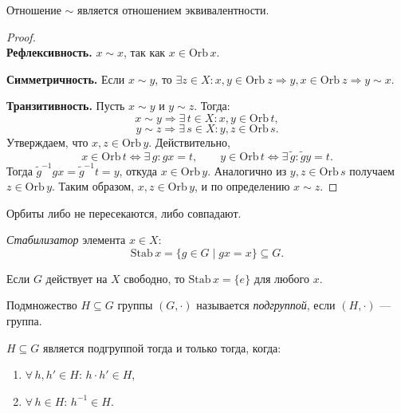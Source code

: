 \begin{stmt}
    Отношение $\sim$ является отношением эквивалентности.
    \begin{proof}

        \textbf{\\Рефлексивность.} $x \sim x$, так как $x \in \mathrm{Orb}\, x$.

        \textbf{Симметричность.} Если $x \sim y$, то $\exists z \in X: x, y \in \mathrm{Orb}\ z \Rightarrow
        y, x \in \mathrm{Orb}\ z \Rightarrow y \sim x$.

        \textbf{Транзитивность.} Пусть $x \sim y$ и $y \sim z$. Тогда:
        \[
            x \sim y \Rightarrow \exists\, t \in X\colon x, y \in \mathrm{Orb}\, t,
        \]
        \[
            y \sim z \Rightarrow \exists\, s \in X\colon y, z \in \mathrm{Orb}\, s.
        \]
        Утверждаем, что $x, z \in \mathrm{Orb}\, y$. Действительно,
        \[
            x \in \mathrm{Orb}\, t \Leftrightarrow \exists\, g\colon gx = t,
            \qquad
            y \in \mathrm{Orb}\, t \Leftrightarrow \exists\, \tilde{g}\colon \tilde{g}y = t.
        \]
        Тогда $\tilde{g}^{-1} g x = \tilde{g}^{-1} t = y$, откуда $x \in \mathrm{Orb}\, y$.
        Аналогично из $y, z \in \mathrm{Orb}\, s$ получаем $z \in \mathrm{Orb}\, y$.
        Таким образом, $x, z \in \mathrm{Orb}\, y$, и по определению $x \sim z$.
    \end{proof}
\end{stmt}

\begin{cor}
    Орбиты либо не пересекаются, либо совпадают.
\end{cor}



\begin{definition}
    \emph{Стабилизатор} элемента $x \in X$:
    \[
        \mathrm{Stab}\, x = \{g \in G \mid gx = x\} \subseteq G.
    \]
\end{definition}

\begin{example}
    Если $G$ действует на $X$ свободно, то $\mathrm{Stab}\, x = \{e\}$ для любого $x$.
\end{example}

\begin{definition}
    Подмножество $H \subseteq G$ группы $(G, \cdot)$ называется \emph{подгруппой}, если $(H, \cdot)$ --- группа.
\end{definition}

\begin{stmt}
    $H \subseteq G$ является подгруппой тогда и только тогда, когда:
    \begin{enumerate}
        \item $\forall\, h, h' \in H$: $h \cdot h' \in H$,
        \item $\forall\, h \in H$: $h^{-1} \in H$.
    \end{enumerate}
\end{stmt}

